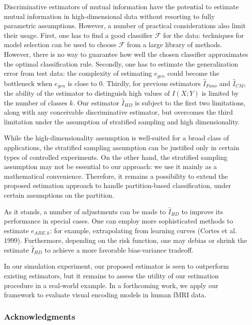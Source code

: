 \documentclass{article}
\begin{document}
Discriminative estimators of mutual information have the potential to estimate
mutual information in high-dimensional data without resorting to fully parametric assumptions.
However, a number of practical considerations also limit their usage.
First, one has to find a good classifier $\mathcal{F}$ for the data:
techniques for model selection can be used to choose $\mathcal{F}$
from a large library of methods.  However, there is no way to guarantee how well
the chosen classifier approximates the optimal classification rule.
Secondly, one has to estimate the generalization error from test data:
the complexity of estimating $e_{gen}$ could become the bottleneck when $e_{gen}$ is close to 0.
Thirdly, for previous estimators $\hat{I}_{Fano}$ and $\hat{I}_{CM}$,
the ability of the estimator to distinguish high values of $I(X; Y)$ is limited by the number of classes $k$.
Our estimator $\hat{I}_{HD}$ is subject to the first two limitations, along with
any conceivable discriminative estimator, but overcomes the third limitation
under the assumption of stratified sampling and high dimensionality.

While the high-dimensionality assumption is well-suited for a broad class of applications,
the stratified sampling assumption can be justified only in certain types of controlled experiments.
On the other hand, the stratified sampling assumption may not be essential to our approach:
we use it mainly as a mathematical convenience.  Therefore, it remains a possibility to
extend the proposed estimation approach to handle partition-based classification, under certain assumptions
on the partition.

As it stands, a number of adjustments can be made to $\hat{I}_{HD}$ to improve
its performance in special cases.  One can employ more sophisticated methods to
estimate $e_{ABE, k}$: for example, extrapolating from learning curves (Cortes et al. 1999).
Furthermore, depending on the risk function, one may debias or shrink the estimate $\hat{I}_{HD}$
to achieve a more favorable bias-variance tradeoff.

In our simulation experiment, our proposed estimator is seen to outperform existing
estimators, but it remains to assess the utility of our estimation
procedure in a real-world example.  In a forthcoming work, we apply our framework to evaluate visual encoding models in human fMRI data.


\subsubsection*{Acknowledgments}
\end{document}
